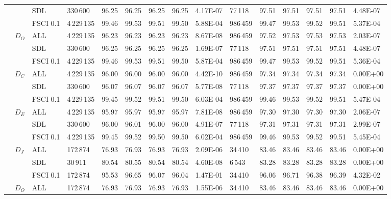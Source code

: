 \begin{table*}[h]
\begin{tabular}{|lllllllllllllll|}
 & & SDL & 330\,600 & 96.25  & 96.25  & 96.25 & 96.25   & 4.17E-07   & 77\,118 & 97.51  & 97.51  & 97.51 & 97.51   & 4.48E-07    \\
 & & FSCI 0.1   & 4\,229\,135 & 99.46  & 99.53  & 99.51 & 99.50   & 5.88E-04 & 986\,459   & 99.47  & 99.53  & 99.52 & 99.51   & 5.37E-04    \\
 & \multirow{3}{*}{$D_O$}    & ALL & 4\,229\,135& 96.23  & 96.23  & 96.23 & 96.23   & 8.67E-08 & 986\,459   & 97.52  & 97.53  & 97.53 & 97.53   & 2.03E-07    \\
 & & SDL & 330\,600 & 96.25  & 96.25  & 96.25 & 96.25   & 1.69E-07  & 77\,118  & 97.51  & 97.51  & 97.51 & 97.51   & 4.48E-07    \\
 & & FSCI 0.1   & 4\,229\,135 & 99.46  & 99.53  & 99.51 & 99.50   & 5.87E-04  & 986\,459  & 99.47  & 99.53  & 99.52 & 99.51   & 5.36E-04    \\
 & \multirow{3}{*}{$D_C$}    & ALL& 4\,229\,135& 96.00  & 96.00  & 96.00 & 96.00   & 4.42E-10  & 986\,459  & 97.34  & 97.34  & 97.34 & 97.34   & 0.00E+00    \\
 & & SDL & 330\,600 & 96.07  & 96.07  & 96.07 & 96.07   & 5.77E-08  & 77\,118  & 97.37  & 97.37  & 97.37 & 97.37   & 0.00E+00    \\
 & & FSCI 0.1   & 4\,229\,135 & 99.45  & 99.52  & 99.51 & 99.50   & 6.03E-04  & 986\,459  & 99.46  & 99.53  & 99.52 & 99.51   & 5.47E-04    \\
 & \multirow{3}{*}{$D_E$} & ALL & 4\,229\,135& 95.97  & 95.97  & 95.97 & 95.97   & 7.81E-08 & 986\,459   & 97.30  & 97.30  & 97.30 & 97.30   & 2.06E-07    \\
 & & SDL & 330\,600 & 96.00  & 96.01  & 96.00 & 96.00   & 4.91E-07  & 77\,118  & 97.31  & 97.31  & 97.31 & 97.31   & 2.99E-07    \\
 & & FSCI 0.1  & 4\,229\,135  & 99.45  & 99.52  & 99.50 & 99.50   & 6.02E-04  & 986\,459  & 99.46  & 99.53  & 99.52 & 99.51   & 5.45E-04    \\
\hline
\multirow{12}{*}{\PARAM{}} & \multirow{3}{*}{$D_J$}   & ALL & 172\,874& 76.93  & 76.93  & 76.93 & 76.93   & 2.09E-06  & 34\,410  & 83.46  & 83.46  & 83.46 & 83.46   & 0.00E+00    \\
 & & SDL & 30\,911 & 80.54  & 80.55  & 80.54 & 80.54   & 4.60E-08 & 6\,543   & 83.28  & 83.28  & 83.28 & 83.28   & 0.00E+00    \\
 & & FSCI 0.1   & 172\,874 & 95.53  & 96.65  & 96.07 & 96.04   & 1.47E-01  & 34\,410  & 96.06  & 96.71  & 96.38 & 96.39   & 4.32E-02    \\
 & \multirow{3}{*}{$D_O$}    & ALL & 172\,874& 76.93  & 76.93  & 76.93 & 76.93   & 1.55E-06 & 34\,410   & 83.46  & 83.46  & 83.46 & 83.46   & 0.00E+00    \\

\end{tabular}
\end{table*}
